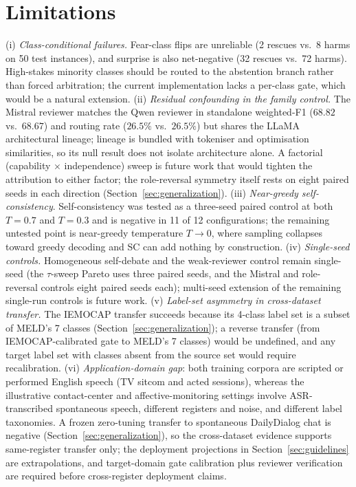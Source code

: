 \documentclass[final,5p,times,twocolumn]{elsarticle}
\begin{document}
\section{Limitations}
\label{sec:limitations}
(i) \emph{Class-conditional failures.} Fear-class flips are unreliable (2
rescues vs.\ 8 harms on 50 test instances), and surprise is also
net-negative (32 rescues vs.\ 72 harms). High-stakes minority classes
should be routed to the abstention branch rather than forced arbitration;
the current implementation lacks a per-class gate, which would be a natural
extension. (ii) \emph{Residual confounding in the family control.} The
Mistral reviewer matches the Qwen reviewer in standalone weighted-F1
($68.82$ vs.\ $68.67$) and routing rate ($26.5\%$ vs.\ $26.5\%$) but shares
the LLaMA architectural lineage; lineage is bundled with tokeniser and
optimisation similarities, so its null result does not isolate architecture
alone. A factorial (capability $\times$ independence) sweep is future work
that would tighten the attribution to either factor; the role-reversal
symmetry itself rests on eight paired seeds in each direction
(Section~\ref{sec:generalization}). (iii) \emph{Near-greedy self-consistency}.
Self-consistency was tested as a three-seed paired control at both
$T{=}0.7$ and $T{=}0.3$ and is negative in 11 of 12 configurations; the
remaining untested point is near-greedy temperature $T{\to}0$, where
sampling collapses toward greedy decoding and SC can add nothing by
construction. (iv) \emph{Single-seed controls.} Homogeneous self-debate and the
weak-reviewer control remain single-seed (the $\tau$-sweep Pareto uses three
paired seeds, and the Mistral and role-reversal controls eight paired seeds
each); multi-seed extension of the remaining single-run controls is future
work. (v) \emph{Label-set asymmetry in cross-dataset transfer.}
The IEMOCAP transfer succeeds because its 4-class label set is a subset of
MELD's 7 classes (Section~\ref{sec:generalization}); a reverse transfer
(from IEMOCAP-calibrated gate to MELD's 7 classes) would be undefined,
and any target label set with classes absent from the source set would
require recalibration. (vi) \emph{Application-domain gap}: both training
corpora are scripted or performed English speech (TV sitcom and acted
sessions), whereas the illustrative contact-center and affective-monitoring
settings involve ASR-transcribed spontaneous speech, different registers
and noise, and different label taxonomies. A frozen zero-tuning transfer to
spontaneous DailyDialog chat is negative (Section~\ref{sec:generalization}),
so the cross-dataset evidence supports same-register transfer only; the
deployment projections in Section~\ref{sec:guidelines} are extrapolations,
and target-domain gate calibration plus reviewer verification are required
before cross-register deployment claims.
\end{document}
